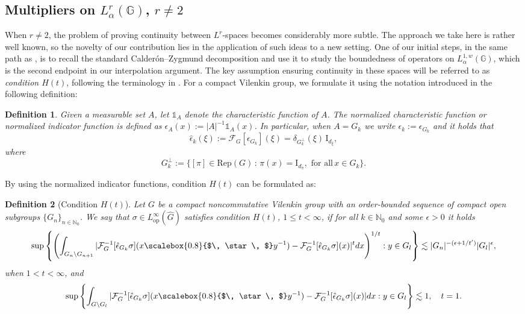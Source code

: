 \documentclass[12pt, reqno]{amsart}
\newtheorem{defi}{Definition}[section]
\newcommand{\1}{\mathds{1}}
\newcommand{\G}{\mathbb{G}}
\newcommand{\smallstar}{\scalebox{0.8}{$\, \star \, $}}
\begin{document}
\subsection{Multipliers on $L^r_\alpha (\G)$, $r \neq 2$} When \(r \neq 2\), the problem of proving continuity between \(L^{r}\)-spaces becomes considerably more subtle. The approach we take here is rather well known, so the novelty of our contribution lies in the application of such ideas to a new setting. One of our initial steps, in the same path as \cite{Onneweer1985, Onneweer1989}, is to recall the standard Calderón--Zygmund decomposition and use it to study the boundedness of operators on \(L^{1,w}_{\alpha}(\mathbb{G})\), which is the second endpoint in our interpolation argument. The key assumption ensuring continuity in these spaces will be referred to as \emph{condition \(H(t)\)}, following the terminology in \cite{Onneweer1985, Onneweer1989}. For a compact Vilenkin group, we formulate it using the notation introduced in the following definition: 

\begin{defi}\normalfont
Given a measurable set $A$, let $\1_A$ denote the characteristic function of $A$. The \emph{normalized characteristic function} or \emph{normalized indicator function} is defined as $\epsilon_A(x) := |A|^{-1} \mathbb{1}_A(x)$. In particular, when $A=G_k$ we write $\epsilon_k:= \epsilon_{G_k}$ and it holds that $$\widehat{\epsilon}_k(\xi):=  \mathcal{F}_G [\epsilon_{G_k}] (\xi) = \delta_{G_k^\bot} (\xi ) \,  \mathrm{I}_{d_\xi},$$where $$G_k^\bot:= \{ [\pi] \in \mathrm{Rep}(G) \, : \, \pi(x)= \mathrm{I}_{d_\pi}, \,\, \text{for all} \, x \in G_k\}.$$      
\end{defi}

By using the normalized indicator functions, condition $H(t)$ can be formulated as:

\begin{defi}[Condition $H(t)$]\label{conditionH(t)}
Let $G$ be a compact noncommutative Vilenkin group with an order-bounded sequence of compact open subgroups $\{G_n\}_{n \in \mathbb{N}_0}$. We say that $\sigma \in L^\infty_{\text{op}}(\hat{G})$ satisfies condition $H(t)$, $1 \le t < \infty$, if for all $k \in \mathbb{N}_0$ and some $\epsilon > 0$ it holds
\[
\sup \left\{
\left(\int_{G_n \setminus G_{n+1}} |\mathcal{F}_G^{-1}[\hat{\epsilon}_{G_k} \sigma](x \smallstar y^{-1}) - \mathcal{F}_G^{-1}[\hat{\epsilon}_{G_k} \sigma](x)|^t dx\right)^{1/t} : y \in G_l
\right\} \lesssim |G_n|^{-(\epsilon+1/t')} |G_l|^\epsilon,
\]when $1 < t < \infty$, 
and
\[
\sup \left\{
\int_{G \setminus G_l} |\mathcal{F}_G^{-1}[\hat{\epsilon}_{G_k} \sigma](x \smallstar y^{-1}) - \mathcal{F}_G^{-1}[\hat{\epsilon}_{G_k} \sigma](x)| dx : y \in G_l
\right\} \lesssim 1, \quad t=1.
\]
\end{defi}
\end{document}
